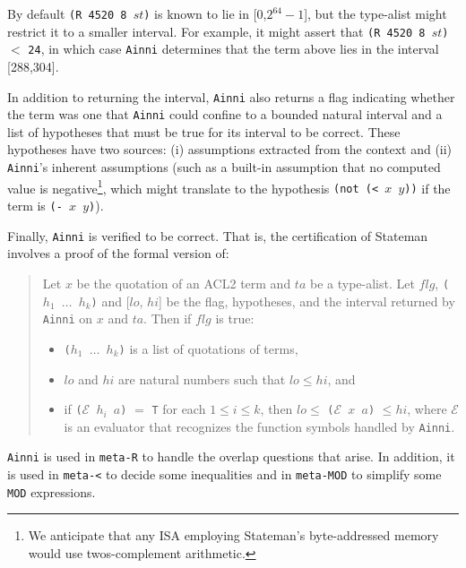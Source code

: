 \documentclass[submission,copyright,creativecommons]{eptcs}
\newcommand{\ptt}[1]{\tt{#1}}
\begin{document}
By default {\ptt{(R 4520 8 $st$)}} is known to lie in
[0,$2^{64}-1$], but the type-alist might restrict it to a smaller interval.
For example, it might assert that {\ptt{(R 4520 8 $st$)}} $<$ {\ptt{24}}, in which case
{\ptt{Ainni}} determines that the term above lies in the interval [288,304].

In addition to returning the interval, {\ptt{Ainni}} also returns a flag
indicating whether the term was one that {\ptt{Ainni}} could confine to a
bounded natural interval and a list of hypotheses that must be true for its
interval to be correct.  These hypotheses have two sources: (i) assumptions
extracted from the context and (ii) {\ptt{Ainni}}'s inherent assumptions
(such as a built-in assumption that no computed value is negative\footnote{We
  anticipate that any ISA employing Stateman's byte-addressed memory would
  use twos-complement arithmetic.}, which might translate to the hypothesis
{\ptt{(not (< $x$ $y$))}} if the term is {\ptt{(- $x$ $y$)}}).

Finally, {\ptt{Ainni}} is verified to be correct.  That is, the certification of
Stateman involves a proof of the formal version of:

\begin{quotation} Let $x$ be the quotation of an ACL2 term and $ta$ be a type-alist.
Let $flg$, {\ptt{($h_1$ $\ldots$ $h_k$)}} and [$lo$, $hi$] be the flag, hypotheses, and the
interval returned by {\ptt{Ainni}} on $x$ and $ta$.
Then if $flg$ is true:

\begin{itemize}
\item {\ptt{($h_1$ $\ldots$ $h_k$)}} is a list of quotations of terms,

\item $lo$ and $hi$ are natural numbers such that $lo \leq hi$, and

\item if {\ptt{($\mathcal{E}$ $h_i$ $a$)}} $=$
  {\ptt{T}} for each $1 \leq i \leq k$, then $lo \leq$ {\ptt{($\mathcal{E}$ $x$ $a$)}} $\leq hi$,
where $\mathcal{E}$ is an evaluator that recognizes the function symbols handled by {\ptt{Ainni}}.
\end{itemize}
\end{quotation}

{\ptt{Ainni}} is used in {\ptt{meta-R}} to handle the overlap questions that
arise.  In addition, it is used in {\ptt{meta-<}} to decide some inequalities and in {\ptt{meta-MOD}}
to simplify some {\ptt{MOD}} expressions.
\end{document}
